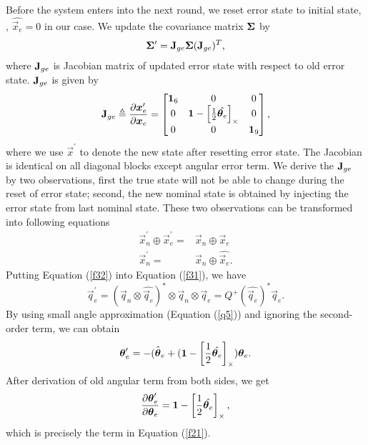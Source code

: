 Before the system enters into the next round, we reset error state to initial state, \ie, $\hat{\vec{x}_e} = 0$ in our case. We update the covariance matrix $\mathbf{\Sigma}$ by
\begin{equation}\label{f20}
	\mathbf{\Sigma}^\prime = \mathbf{J}_{ge} \mathbf{\Sigma} (\mathbf{J}_{ge})^T,
\end{equation}
where $\mathbf{J}_{ge}$ is Jacobian matrix of updated error state with respect to old error state. $\mathbf{J}_{ge}$ is given by
\begin{equation}\label{f21}
	\mathbf{J}_{ge} \triangleq \dfrac{\partial{\boldsymbol{x}_e^\prime}}{\partial{\boldsymbol{x}_e}} = \begin{bmatrix}
	\mathbf{1}_6 & 0 & 0 \\
	0 & \mathbf{1} - \left[ \frac{1}{2} \hat{\boldsymbol{\theta}_e} \right]_\times & 0 \\
	0 & 0 & \mathbf{1}_9 \\
	\end{bmatrix},
\end{equation}
where we use $\vec{x}^\prime$ to denote the new state after resetting error state. The Jacobian is identical on all diagonal blocks except angular error term. We derive the $\mathbf{J}_{ge}$ by two observations, first the true state will not be able to change during the reset of error state; second, the new nominal state is obtained by injecting the error state from last nominal state. These two observations can be transformed into following equations
\begin{align}
	\label{f31}
	\vec{x}_n^\prime \oplus \vec{x}_e^\prime =& \vec{x}_n \oplus \vec{x}_e \\
	\label{f32}
	\vec{x}_n^\prime =& \vec{x}_n \oplus \hat{\vec{x}_e}.
\end{align}
Putting Equation (\ref{f32}) into Equation (\ref{f31}), we have
\begin{equation}
	\vec{q}_e^\prime = (\vec{q}_n \otimes \hat{\vec{q}_e})^* \otimes \vec{q}_n \otimes \vec{q}_e = Q^+(\hat{\vec{q}_e})^*\vec{q}_e.
\end{equation}
By using small angle approximation (Equation (\ref{q5})) and ignoring the second-order term, we can obtain 
\begin{equation}
	\boldsymbol{\theta}_e^\prime = -\hat{(\boldsymbol{\theta}_e} + (\mathbf{1} - \left[ \frac{1}{2} \hat{\boldsymbol{\theta}_e} \right]_\times)\boldsymbol{\theta}_e.
\end{equation}
After derivation of old angular term from both sides, we get 
\begin{equation}
	\dfrac{\partial{\boldsymbol{\theta}_e^\prime}}{\partial{\boldsymbol{\theta}_e}} = \mathbf{1} - \left[ \frac{1}{2} \hat{\boldsymbol{\theta}_e} \right]_\times,
\end{equation}
which is precisely the term in Equation (\ref{f21}).
